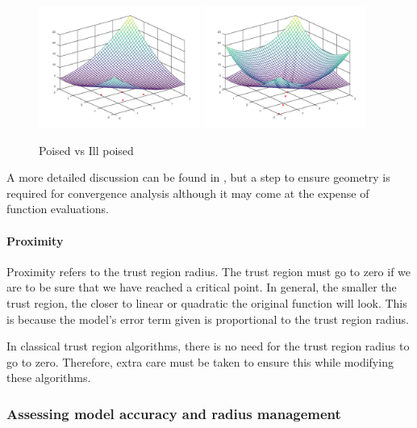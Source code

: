\documentclass{article}
\theoremstyle{case}
\begin{document}
\begin{figure}[h]
    \centering
    \includegraphics[width=200px]{images/poised_good.png}
    \includegraphics[width=200px]{images/poised_bad.png}
    \caption{Poised vs Ill poised}
    \label{pvip}
\end{figure}


\begin{center}

\end{center}

A more detailed discussion can be found in \cite{doi:10.1080/10556780802409296}, but a step to ensure geometry is required for convergence analysis although it may come at the expense of function evaluations.

\paragraph{Proximity}

Proximity refers to the trust region radius.
The trust region must go to zero if we are to be sure that we have reached a critical point.
In general, the smaller the trust region, the closer to linear or quadratic the original function will look.
This is because the model's error term given is proportional to the trust region radius.

In classical trust region algorithms, there is no need for the trust region radius to go to zero.
Therefore, extra care must be taken to ensure this while modifying these algorithms.

\subsubsection{Assessing model accuracy and radius management}
\end{document}
